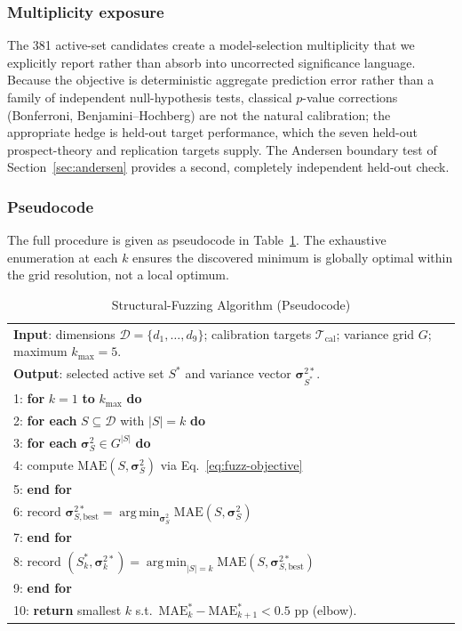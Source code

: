 \documentclass[journal]{IEEEtran}
\DeclareMathOperator*{\argmin}{arg\,min}
\begin{document}
\subsubsection{Multiplicity exposure}
The 381 active-set candidates create a model-selection multiplicity that we explicitly report rather than absorb into uncorrected significance language.
Because the objective is deterministic aggregate prediction error rather than a family of independent null-hypothesis tests, classical $p$-value corrections (Bonferroni, Benjamini--Hochberg) are not the natural calibration; the appropriate hedge is held-out target performance, which the seven held-out prospect-theory and replication targets supply.
The Andersen boundary test of Section~\ref{sec:andersen} provides a second, completely independent held-out check.

\subsubsection{Pseudocode}
The full procedure is given as pseudocode in Table~\ref{alg:fuzz}.
The exhaustive enumeration at each $k$ ensures the discovered minimum is globally optimal within the grid resolution, not a local optimum.

\begin{table}[!t]
\renewcommand{\arraystretch}{1.05}
\caption{Structural-Fuzzing Algorithm (Pseudocode)}
\label{alg:fuzz}
\centering
\begin{tabular}{@{}p{}@{}}
\toprule
\textbf{Input}: dimensions $\mathcal{D}=\{d_1,\dots,d_9\}$; calibration targets $\mathcal{T}_{\text{cal}}$; variance grid $G$; maximum $k_{\max}=5$. \\
\textbf{Output}: selected active set $S^*$ and variance vector $\boldsymbol{\sigma}_{S^*}^{2*}$. \\
\midrule
1: \textbf{for} $k=1$ \textbf{to} $k_{\max}$ \textbf{do} \\
2: \quad \textbf{for each} $S\subseteq\mathcal{D}$ with $|S|=k$ \textbf{do} \\
3: \quad\quad \textbf{for each} $\boldsymbol{\sigma}_S^2 \in G^{|S|}$ \textbf{do} \\
4: \quad\quad\quad compute $\text{MAE}(S,\boldsymbol{\sigma}_S^2)$ via Eq.~\eqref{eq:fuzz-objective} \\
5: \quad\quad \textbf{end for} \\
6: \quad\quad record $\boldsymbol{\sigma}^{2*}_{S,\text{best}}=\argmin_{\boldsymbol{\sigma}_S^2}\text{MAE}(S,\boldsymbol{\sigma}_S^2)$ \\
7: \quad \textbf{end for} \\
8: \quad record $(S_k^*,\boldsymbol{\sigma}_k^{2*}) = \argmin_{|S|=k}\text{MAE}(S,\boldsymbol{\sigma}^{2*}_{S,\text{best}})$ \\
9: \textbf{end for} \\
10: \textbf{return} smallest $k$ s.t.\ $\text{MAE}_k^*-\text{MAE}_{k+1}^* < 0.5\text{~pp}$ (elbow). \\
\bottomrule
\end{tabular}
\end{table}
\end{document}
